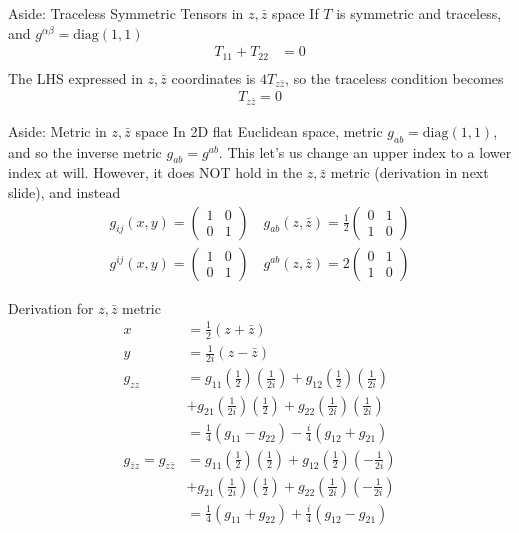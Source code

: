 \documentclass{beamer}
\begin{document}
\begin{frame}{Aside: Traceless Symmetric Tensors in $z,\bar{z}$ space}
    If $T$ is symmetric and traceless, and $g^{\alpha\beta}=\text{diag}(1,1)$
    \begin{align}
        T_{11} + T_{22} &= 0 \\
    \end{align}
    The LHS expressed in $z,\bar z$ coordinates is $4 T_{z\bar z}$, so the traceless condition becomes
    \begin{align}
        T_{z\bar z}=0
    \end{align}
\end{frame}
\begin{frame}{Aside: Metric in $z,\bar{z}$ space}
    In 2D flat Euclidean space, metric $g_{ab} = \text{diag}(1,1)$, and so the inverse metric $g_{ab} = g^{ab}$. This let's us change an upper index to a lower index at will. However, it does NOT hold in the $z,\bar z$ metric (derivation in next slide), and instead
    \begin{align}
    g_{i j}{(x, y)}=\left(\begin{array}{ll}
1 & 0 \\
0 & 1
\end{array}\right) \quad g_{a b}{(z, \bar{z})}=\frac{1}{2}\left(\begin{array}{ll}
0 & 1 \\
1 & 0
\end{array}\right) \\
    g^{i j}{(x, y)}=\left(\begin{array}{ll}
1 & 0 \\
0 & 1
\end{array}\right) \quad g^{a b}{(z, \bar{z})}=2 \left(\begin{array}{ll}
0 & 1 \\
1 & 0 
\end{array}\right) \label{eq:gzz}
    \end{align}
\end{frame}
\begin{frame}{Derivation for $z,\bar{z}$ metric}
    \begin{align}
     x&=\frac{1}{2}(z+\bar{z}) \\
 y&=\frac{1}{2 i}(z-\bar{z}) \\
g_{z z}&=g_{11}\left(\frac{1}{2}\right)\left(\frac{1}{2 i}\right)+g_{12}\left(\frac{1}{2}\right)\left(\frac{1}{2 i}\right)\\
&+g_{21}\left(\frac{1}{2 i}\right)\left(\frac{1}{2}\right)+g_{22}\left(\frac{1}{2 i}\right)\left(\frac{1}{2 i}\right) \\
& =\frac{1}{4}\left(g_{11}-g_{22}\right)-\frac{i}{4}\left(g_{12}+g_{21}\right)  \\
g_{\bar z z}=g_{z \bar z}&=g_{11}\left(\frac{1}{2}\right)\left(\frac{1}{2}\right)+g_{12}\left(\frac{1}{2}\right)\left(-\frac{1}{2 i}\right)\\
&+g_{21}\left(\frac{1}{2 i}\right)\left(\frac{1}{2}\right)+g_{22}\left(\frac{1}{2 i}\right)\left(-\frac{1}{2 i}\right)  \\
& = \frac{1}{4} (g_{11} + g_{22}) + \frac{i}{4} (g_{12} - g_{21})
    \end{align}
\end{frame}
\end{document}

